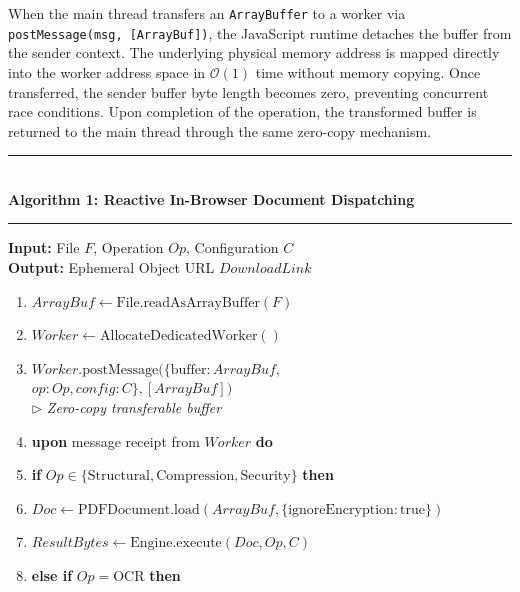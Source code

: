 \documentclass[journal]{IEEEtran}
\begin{document}
When the main thread transfers an \texttt{ArrayBuffer} to a worker via \texttt{postMessage(msg, [ArrayBuf])}, the JavaScript runtime detaches the buffer from the sender context. The underlying physical memory address is mapped directly into the worker address space in $\mathcal{O}(1)$ time without memory copying. Once transferred, the sender buffer byte length becomes zero, preventing concurrent race conditions. Upon completion of the operation, the transformed buffer is returned to the main thread through the same zero-copy mechanism.

\begin{table}[!t]
\noindent\begin{minipage}{\columnwidth}
\rule{\columnwidth}{0.4pt} \\[2pt]
\textbf{\small Algorithm 1: Reactive In-Browser Document Dispatching} \\
\rule{\columnwidth}{0.4pt}
\begin{footnotesize}
\raggedright
\noindent\textbf{Input:} File $F$, Operation $Op$, Configuration $C$ \\
\noindent\textbf{Output:} Ephemeral Object URL $DownloadLink$
\begin{enumerate}[leftmargin=14pt, topsep=2pt, itemsep=1pt]
\item $ArrayBuf \leftarrow \text{File.readAsArrayBuffer}(F)$
\item $Worker \leftarrow \text{AllocateDedicatedWorker}()$
\item $Worker.\text{postMessage}(\{ \text{buffer}: ArrayBuf,$ \\
      \quad\quad $op: Op, config: C \}, [ArrayBuf])$ \\
      \quad\quad $\triangleright$ \textit{Zero-copy transferable buffer}
\item \textbf{upon} message receipt from $Worker$ \textbf{do}
\item[] \hspace{10pt} \textbf{if} $Op \in \{\text{Structural}, \text{Compression}, \text{Security}\}$ \textbf{then}
\item[] \hspace{20pt} $Doc \leftarrow \text{PDFDocument.load}(ArrayBuf, \{\text{ignoreEncryption}: \text{true}\})$
\item[] \hspace{20pt} $ResultBytes \leftarrow \text{Engine.execute}(Doc, Op, C)$
\item[] \hspace{10pt} \textbf{else if} $Op = \text{OCR}$ \textbf{then}

\end{enumerate}
\end{footnotesize}
\end{minipage}
\end{table}
\end{document}
